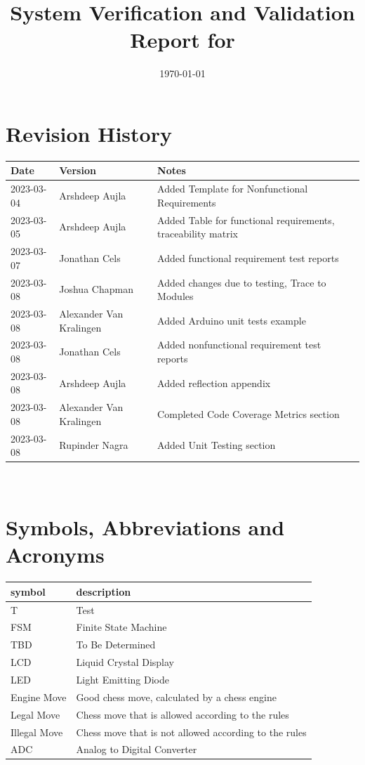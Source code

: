 \documentclass[12pt, titlepage]{article}
\begin{document}
\title{System Verification and Validation Report for \progname{}} 
\author{\authname}
\date{\today}
	
\maketitle


\section{Revision History}

\begin{tabularx}{\textwidth}{p{3cm}p{2cm}X}
\toprule {\bf Date} & {\bf Version} & {\bf Notes}\\
\midrule
2023-03-04 & Arshdeep Aujla & Added Template for Nonfunctional Requirements\\
2023-03-05 & Arshdeep Aujla & Added Table for functional requirements, traceability matrix\\
2023-03-07 & Jonathan Cels & Added functional requirement test reports\\
2023-03-08 & Joshua Chapman & Added changes due to testing, Trace to Modules\\
2023-03-08 & Alexander Van Kralingen & Added Arduino unit tests example\\
2023-03-08 & Jonathan Cels & Added nonfunctional requirement test reports\\
2023-03-08 & Arshdeep Aujla & Added reflection appendix\\
2023-03-08 & Alexander Van Kralingen & Completed Code Coverage Metrics section\\
2023-03-08 & Rupinder Nagra & Added Unit Testing section\\
\bottomrule
\end{tabularx}

~\newpage

\section{Symbols, Abbreviations and Acronyms}

\renewcommand{\arraystretch}{1.2}
\begin{tabular}{l l} 
    \toprule		
    \textbf{symbol} & \textbf{description}\\
    \midrule 
    T & Test\\
  FSM & Finite State Machine\\
    TBD & To Be Determined\\
    LCD & Liquid Crystal Display\\
    LED & Light Emitting Diode\\
    Engine Move & Good chess move, calculated by a chess engine\\
    Legal Move & Chess move that is allowed according to the rules\\
    Illegal Move & Chess move that is not allowed according to the rules\\
    ADC & Analog to Digital Converter\\
  \bottomrule
\end{tabular}\\
\end{document}

